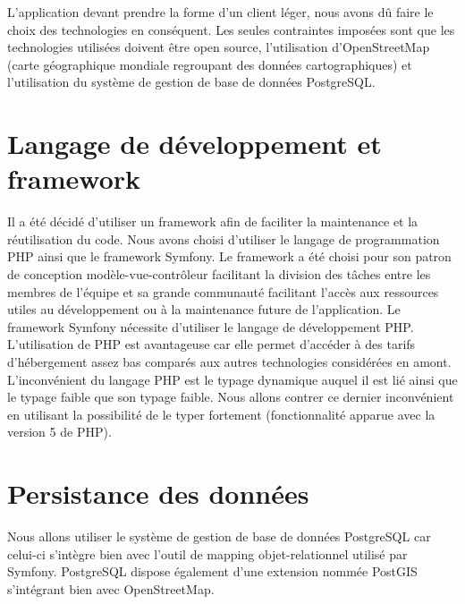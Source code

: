 

L'application devant prendre la forme d'un client léger, nous avons dû faire le choix des technologies en conséquent. Les seules contraintes imposées sont que les technologies utilisées doivent être open source, l'utilisation d'OpenStreetMap (carte géographique mondiale regroupant des données cartographiques) et l'utilisation du système de gestion de base de données PostgreSQL.

\section{Langage de développement et framework}
Il a été décidé d'utiliser un framework afin de faciliter la maintenance et la réutilisation du code.
Nous avons choisi d'utiliser le langage de programmation PHP ainsi que le framework Symfony. Le framework a été choisi pour son patron de conception modèle-vue-contrôleur facilitant la division des tâches entre les membres de l'équipe et sa grande communauté facilitant l'accès aux ressources utiles au développement ou à la maintenance future de l'application.
Le framework Symfony nécessite d'utiliser le langage de développement PHP. L'utilisation de PHP est avantageuse car elle permet d'accéder à des tarifs d'hébergement assez bas comparés aux autres technologies considérées en amont.
L'inconvénient du langage PHP est le typage dynamique auquel il est lié ainsi que le typage faible que son typage faible. 
Nous allons contrer ce dernier inconvénient en utilisant la possibilité de le typer fortement (fonctionnalité apparue avec la version 5 de PHP).

\section{Persistance des données}
Nous allons utiliser le système de gestion de base de données PostgreSQL car celui-ci s'intègre bien avec l'outil de mapping objet-relationnel utilisé par Symfony. PostgreSQL dispose également d'une extension nommée PostGIS s'intégrant bien avec OpenStreetMap.